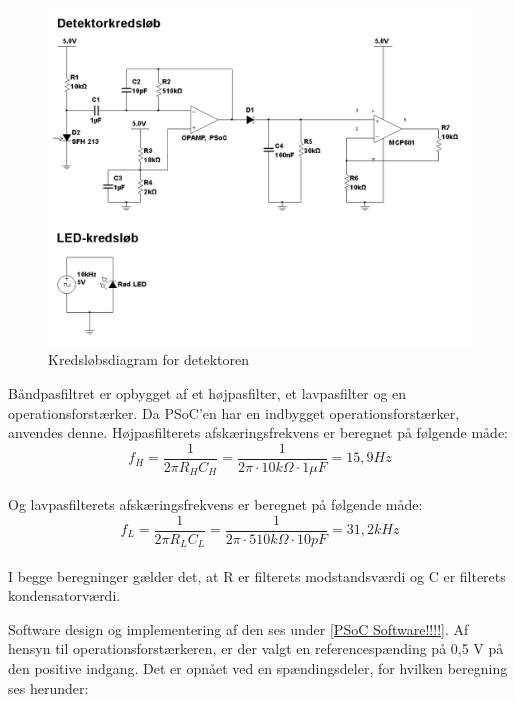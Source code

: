 \begin{figure}[H]
	\centering
	\includegraphics[width=\textwidth]{Afsnit/DesignOgImplementering/images/detektor_tandhjul}
	\caption{Kredsløbsdiagram for detektoren}
	\label{fig:detektortand}
\end{figure}

Båndpasfiltret er opbygget af et højpasfilter, et lavpasfilter og en operationsforstærker. Da PSoC'en har en indbygget operationsforstærker, anvendes denne. Højpasfilterets afskæringsfrekvens er beregnet på følgende måde: \\

\begin{equation}
	f_{H}=\frac{1}{2\pi R_{H} C_{H}}=\frac{1}{2\pi \cdot 10k\Omega \cdot 1\mu F}=15,9Hz
	\label{cutoffhojpas}
\end{equation} \\

Og lavpasfilterets afskæringsfrekvens er beregnet på følgende måde: \\

\begin{equation}
	f_{L} = \frac{1}{2\pi R_{L} C_{L}}=\frac{1}{2\pi \cdot 510k\Omega \cdot 10pF}=31,2kHz
	\label{cutofflavpas}
\end{equation} \\

I begge beregninger gælder det, at R er filterets modstandsværdi og C er filterets kondensatorværdi. 

Software design og implementering af den ses under \ref{PSoC Software!!!!}. Af hensyn til operationsforstærkeren, er der valgt en referencespænding på 0,5 V på den positive indgang. Det er opnået ved en spændingsdeler, for hvilken beregning ses herunder: 

